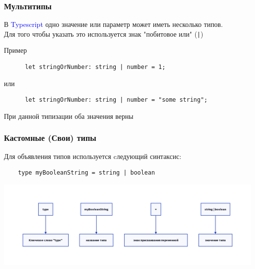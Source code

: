 \documentclass[aspectratio=169]{beamer}
\begin{document}
\begin{frame}[fragile]

  \frametitle{Мультитипы}

  В \textcolor{blue}{Typescript} одно значение или параметр может иметь несколько типов. \\
  Для того чтобы указать это используется знак "побитовое или" (\texttt{|})

  \begin{block}{Пример}
    \begin{verbatim}
      let stringOrNumber: string | number = 1;
    \end{verbatim}
    \begin{center}
      или
    \end{center}
    \begin{verbatim}
      let stringOrNumber: string | number = "some string";
    \end{verbatim}

    \begin{center}
      При данной типизации оба значения верны
    \end{center}
    
  \end{block}
  
  
\end{frame}

\begin{frame}[fragile]

  \frametitle{Кастомные (Свои) типы}

  Для объявления типов используется cледующий синтаксис:

  \begin{verbatim}
    type myBooleanString = string | boolean
  \end{verbatim}
  \includegraphics[width=\textwidth]{assets/custom_type.png}
\end{frame}
\end{document}
